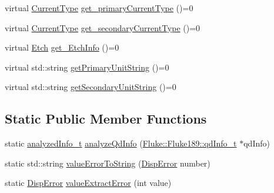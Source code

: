 \begin{DoxyCompactItemize}
\item 
virtual \hyperlink{classFluke_1_1Fluke189DataResponseAnalyzerWrapper_afef24496da239e3613c40ad3582d7adc}{CurrentType} \hyperlink{classFluke_1_1Fluke189DataResponseAnalyzerWrapper_afb7361d6963bb0edd9194ba72a1583df}{get\_\-primaryCurrentType} ()=0
\item 
virtual \hyperlink{classFluke_1_1Fluke189DataResponseAnalyzerWrapper_afef24496da239e3613c40ad3582d7adc}{CurrentType} \hyperlink{classFluke_1_1Fluke189DataResponseAnalyzerWrapper_a21a39a54587e31af04c931b46aa11806}{get\_\-secondaryCurrentType} ()=0
\item 
virtual \hyperlink{classFluke_1_1Fluke189DataResponseAnalyzerWrapper_ada71f6ab32a7b0eb40bb0ed96d7053bc}{Etch} \hyperlink{classFluke_1_1Fluke189DataResponseAnalyzerWrapper_a258e56c1ff27b8aae648940599d3b475}{get\_\-EtchInfo} ()=0
\item 
virtual std::string \hyperlink{classFluke_1_1Fluke189DataResponseAnalyzerWrapper_a54f606e7d645b34c075074d72b291ce8}{getPrimaryUnitString} ()=0
\item 
virtual std::string \hyperlink{classFluke_1_1Fluke189DataResponseAnalyzerWrapper_ae8fa175a376f000e0ccebef46b0f6cc2}{getSecondaryUnitString} ()=0
\end{DoxyCompactItemize}
\subsection*{Static Public Member Functions}
\begin{DoxyCompactItemize}
\item 
static \hyperlink{structFluke_1_1Fluke189DataResponseAnalyzerWrapper_1_1analyzedInfo__t}{analyzedInfo\_\-t} \hyperlink{classFluke_1_1Fluke189DataResponseAnalyzerWrapper_a2bec1dad601bc993375d358ef77c7e6b}{analyzeQdInfo} (\hyperlink{structFluke_1_1Fluke189_1_1qdInfo__t}{Fluke::Fluke189::qdInfo\_\-t} $\ast$qdInfo)
\item 
static std::string \hyperlink{classFluke_1_1Fluke189DataResponseAnalyzerWrapper_aa12dd607815d6ee1530a54855a4b3264}{valueErrorToString} (\hyperlink{classFluke_1_1Fluke189DataResponseAnalyzerWrapper_a5e26140c615bf0b73788f665a7bec9c7}{DispError} number)
\item 
static \hyperlink{classFluke_1_1Fluke189DataResponseAnalyzerWrapper_a5e26140c615bf0b73788f665a7bec9c7}{DispError} \hyperlink{classFluke_1_1Fluke189DataResponseAnalyzerWrapper_ab12ae68ca8c80dce4a952811825de465}{valueExtractError} (int value)
\end{DoxyCompactItemize}

